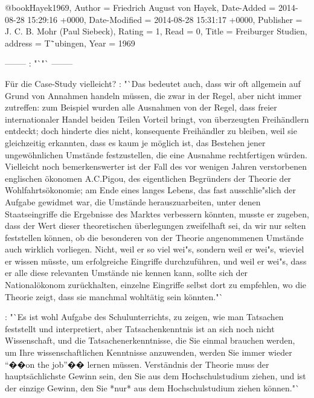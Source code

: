 \documentclass[
    onecolumn,
    a4paper,
    abstracton,
    parskip=half
    ,final
    ]{scrartcl}
\begin{document}
@book{Hayek1969,
  Author = {Friedrich August von Hayek},
  Date-Added = {2014-08-28 15:29:16 +0000},
  Date-Modified = {2014-08-28 15:31:17 +0000},
  Publisher = {J. C. B. Mohr (Paul Siebeck)},
  Rating = {1},
  Read = {0},
  Title = {Freiburger Studien},
  address = {T{\"`u}bingen},
  Year = {1969}}

--------
  \citep[vgl.][S.]{Hayek1969}: "`"`
  --------

F{\"u}r die Case-Study vielleicht?
\citep[vgl.][S.13]{Hayek1969}: "`Das bedeutet auch, dass wir oft allgemein auf Grund von Annahmen handeln m{\"u}ssen, die zwar in der Regel, aber nicht immer zutreffen: zum Beispiel wurden alle Ausnahmen von der Regel, dass freier internationaler Handel beiden Teilen Vorteil bringt, von {\"u}berzeugten Freih{\"a}ndlern entdeckt; doch hinderte dies nicht, konsequente Freih{\"a}ndler zu bleiben, weil sie gleichzeitig erkannten, dass es kaum je m{\"o}glich ist, das Bestehen jener ungew{\"o}hnlichen Umst{\"a}nde festzustellen, die eine Ausnahme rechtfertigen w{\"u}rden. Vielleicht noch bemerkenswerter ist der Fall des vor wenigen Jahren verstorbenen englischen {\"o}konomen A.C.Pigou, des eigentlichen Begr{\"u}nders der Theorie der Wohlfahrts{\"o}konomie; am Ende eines langes Lebens, das fast ausschlie{"s}lich der Aufgabe gewidmet war, die Umst{\"a}nde herauszuarbeiten, unter denen Staatseingriffe die Ergebnisse des Marktes verbessern k{\"o}nnten, musste er zugeben, dass der Wert dieser theoretischen {\"u}berlegungen zweifelhaft sei, da wir nur selten feststellen k{\"o}nnen, ob die besonderen von der Theorie angenommenen Umst{\"a}nde auch wirklich vorliegen. Nicht, weil er so viel wei{"s}, sondern weil er wei{"s}, wieviel er wissen m{\"u}sste, um erfolgreiche Eingriffe durchzuf{\"u}hren, und weil er wei{"s}, dass er alle diese relevanten Umst{\"a}nde nie kennen kann, sollte sich der National{\"o}konom zur{\"u}ckhalten, einzelne Eingriffe selbst dort zu empfehlen, wo die Theorie zeigt, dass sie manchmal wohlt{\"a}tig sein k{\"o}nnten."`

\citep[vgl.][S.15]{Hayek1969}: "`Es ist wohl Aufgabe des Schulunterrichts, zu zeigen, wie man Tatsachen feststellt und interpretiert, aber Tatsachenkenntnis ist an sich noch nicht Wissenschaft, und die Tatsachenerkenntnisse, die Sie einmal brauchen werden, um Ihre wissenschaftlichen Kenntnisse anzuwenden, werden Sie immer wieder "`��on the job"'�� lernen m{\"u}ssen. Verst{\"a}ndnis der Theorie muss der haupts{\"a}chlichste Gewinn sein, den Sie aus dem Hochschulstudium ziehen, und ist der einzige Gewinn, den Sie *nur* aus dem Hochschulstudium ziehen k{\"o}nnen."`
\end{document}

